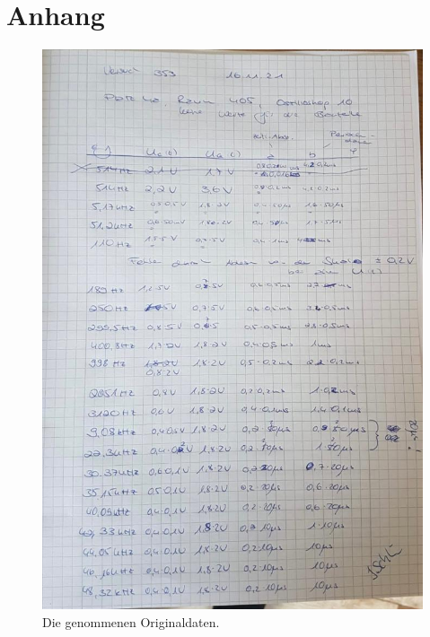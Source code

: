 \section{Anhang}
\label{sec:Anhang}

\begin{figure}
    \centering
    \includegraphics[scale=0.4]{content/origDaten.png}
    \caption{Die genommenen Originaldaten.}
    \label{fig:origDaten}
  \end{figure}